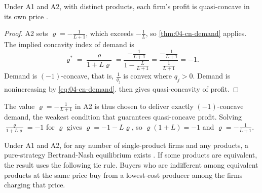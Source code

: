 \begin{proposition}\label{prop:04-cn-quasiconcave}
Under A1 and A2, with distinct products, each firm's profit is quasi-concave in its own price
\citep[Proposition 4]{CaplinNalebuff1991}.
\end{proposition}

\begin{proof}
A2 sets $\varrho = -\frac{1}{L+1}$, which exceeds $-\frac{1}{L}$, so \cref{thm:04-cn-demand} applies. The implied
concavity index of demand is
\[
  \varrho^* = \frac{\varrho}{1 + L\varrho} = \frac{-\frac{1}{L+1}}{1 - \frac{L}{L+1}} = \frac{-\frac{1}{L+1}}{\frac{1}{L+1}} = -1.
\]
Demand is $(-1)$-concave, that is, $\frac{1}{q_j}$ is convex where $q_j > 0$. Demand is nonincreasing by
\eqref{eq:04-cn-demand}.  then gives quasi-concavity of profit.
\end{proof}

The value $\varrho = -\frac{1}{L+1}$ in A2 is thus chosen to deliver exactly $(-1)$-concave demand, the weakest
condition that guarantees quasi-concave profit. Solving $\frac{\varrho}{1 + L\varrho} = -1$ for $\varrho$ gives $\varrho = -1 - L\varrho$, so
$\varrho(1 + L) = -1$ and $\varrho = -\frac{1}{L+1}$.

\begin{theorem}[Existence]\label{thm:04-cn-existence}
Under A1 and A2, for any number of single-product firms and any products, a pure-strategy Bertrand-Nash
equilibrium exists \citep[Theorem 2]{CaplinNalebuff1991}. If some products are equivalent, the result uses the
following tie rule. Buyers who are indifferent among equivalent products at the same price buy from a lowest-cost
producer among the firms charging that price.
\end{theorem}

